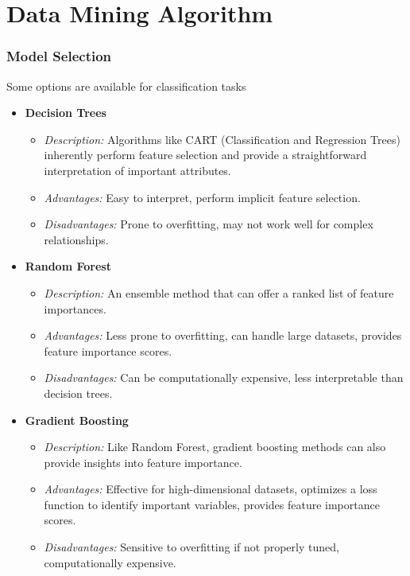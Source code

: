 \part{Data Mining Algorithm}
    \section{Model Selection}
        Some options are available for classification tasks

        \begin{itemize}

            \item \textbf{Decision Trees}
            \begin{itemize}
                \item \textit{Description:} Algorithms like CART (Classification and Regression Trees) inherently perform feature selection and provide a straightforward interpretation of important attributes.
                \item \textit{Advantages:} Easy to interpret, perform implicit feature selection.
                \item \textit{Disadvantages:} Prone to overfitting, may not work well for complex relationships.
            \end{itemize}

            \item \textbf{Random Forest}
            \begin{itemize}
                \item \textit{Description:} An ensemble method that can offer a ranked list of feature importances.
                \item \textit{Advantages:} Less prone to overfitting, can handle large datasets, provides feature importance scores.
                \item \textit{Disadvantages:} Can be computationally expensive, less interpretable than decision trees.
            \end{itemize}

            \item \textbf{Gradient Boosting}
            \begin{itemize}
                \item \textit{Description:} Like Random Forest, gradient boosting methods can also provide insights into feature importance.
                \item \textit{Advantages:} Effective for high-dimensional datasets, optimizes a loss function to identify important variables, provides feature importance scores.
                \item \textit{Disadvantages:} Sensitive to overfitting if not properly tuned, computationally expensive.
            \end{itemize}


\end{itemize}
